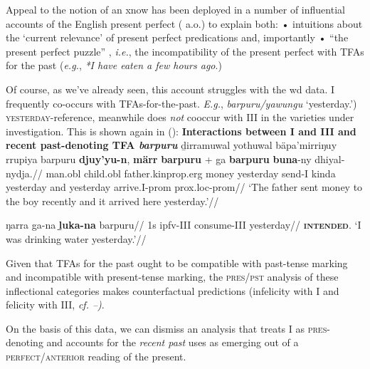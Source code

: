 

Appeal to the notion of an \acrshort{xnow} has been deployed in a number of influential accounts of the English present perfect (\citealp[notably][]{McCoard1978, Portner2003} a.o.) to explain both: • intuitions about the `current relevance' of present perfect predications and, importantly • ``the present perfect puzzle'' \citep[see][]{Klein1992,Schaden2009}, \textit{i.e.}, the incompatibility of the present perfect with \acrshort{TFA}s for the past (\textit{e.g.}, \textit{*I have eaten a few hours ago}.)

Of course, as we've already seen, this account struggles with the \acrshort{wd} data. \gls{I} frequently co-occurs with \acrshort{TFA}s-for-the-past. \textit{E.g.}, \textit{barpuru/yawungu} `yesterday.') \textsc{yester\-day-}reference, meanwhile does \textit{not} cooccur with \gls{III} in the varieties under investigation. This is shown again in ():
\pex{}\textbf{Interactions between \gls{I} and \gls{III} and recent past-denoting \acrshort{TFA} \textit{barpuru}}
\a\begingl{}\gla ḏirramuwal yothuwal bäpa'mirriŋuy rrupiya barpuru \textbf{djuy'yu-n}, \textbf{märr} \textbf{barpuru} + ga \textbf{barpuru} \textbf{buna}-ny dhiyal-nydja.//
\glb man.\gls{obl} child.\gls{obl} father.\gls{kinprop}.\gls{erg} money yesterday send-\gls{I} kinda yesterday and yesterday arrive.\gls{I}-\gls{prom} \gls{prox}.\gls{loc}-\gls{prom}//
\glft`The father sent money to the boy recently and it arrived here yesterday.'//
\endgl

\a{}\begingl\gla \ljudge{*}ŋarra ga-na \textbf{ḻuka-na} barpuru//
\glb 1s \gls{ipfv}-\gls{III} consume-\gls{III} yesterday//
\glft\textsc{\textbf{intended}.} `I was drinking water yesterday.'\trailingcitation{[DhG~20190405]}//\endgl


\xe

Given that TFAs for the past ought to be compatible with past-tense marking and incompatible with present-tense marking, the \textsc{pres/pst} analysis of these inflectional categories makes counterfactual predictions (infelicity with \gls{I} and felicity with \gls{III}, \textit{cf. --)}.

 On the basis of this data, we can dismiss an analysis that treats \gls{I} as \textsc{pres}-denoting and accounts for the \textit{recent past} uses as emerging out of a \textsc{perfect/anterior} reading of the present.


